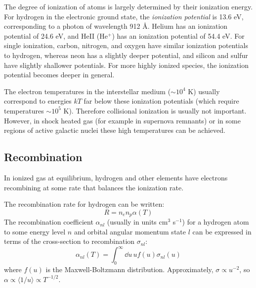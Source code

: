 The degree of ionization of atoms is largely determined by their
ionization energy. For hydrogen in the electronic ground state, the
{\it ionization potential} is 13.6 eV, corresponding to a photon of
wavelength 912 \AA.  Helium has an ionization potential of 24.6 eV,
and HeII (He$^+$) has an ionization potential of 54.4 eV. For single
ionization, carbon, nitrogen, and oxygen have similar ionization
potentials to hydrogen, whereas neon has a slightly deeper potential,
and silicon and sulfur have slightly shallower potentials. For more
highly ionized species, the ionization potential becomes deeper in
general.

The electron temperatures in the interstellar medium ($\sim 10^4$ K)
usually correspond to energies $kT$ far below these ionization
potentials (which require temperatures $\sim 10^5$ K). Therefore
collisional ionization is usually not important. However, in shock
heated gas (for example in supernova remnants) or in some regions of
active galactic nuclei these high temperatures can be achieved.

\subsection{Recombination}

In ionized gas at equilibrium, hydrogen and other elements have
electrons recombining at some rate that balances the ionization rate.

The recombination rate for hydrogen can be written:
\begin{equation}
R = n_e n_p \alpha(T)
\end{equation}
The recombination coefficient $\alpha_{nl}$ (usually in units
cm$^{3}$ s$^{-1}$) for a hydrogen atom to some energy level $n$ and
orbital angular momentum state $l$ can be expressed in terms of the
cross-section to recombination $\sigma_{nl}$:
\begin{equation}
\label{eq:alpha}
\alpha_{nl}(T) = \int_0^\infty \dd{u}\, u f(u) \sigma_{nl}(u)
\end{equation}
where $f(u)$ is the Maxwell-Boltzmann distribution. Approximately,
$\sigma \propto u^{-2}$, so $\alpha\propto \langle 1/u\rangle \propto
T^{-1/2}$.

